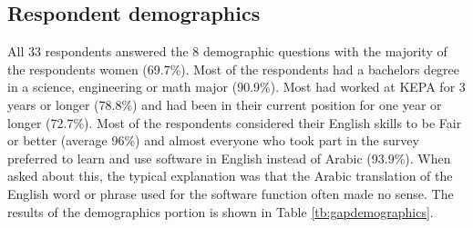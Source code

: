 \subsection{Respondent demographics}
All 33 respondents answered the 8 demographic questions with the majority of the respondents women (69.7\%). Most of the respondents had a bachelors degree in a science, engineering or math major (90.9\%). Most had worked at KEPA for 3 years or longer (78.8\%) and had been in their current position for one year or longer (72.7\%). Most of the respondents considered their English skills to be Fair or better (average 96\%) and almost everyone who took part in the survey preferred to learn and use software in English instead of Arabic (93.9\%). When asked about this, the typical explanation was that the Arabic translation of the English word or phrase used for the software function often made no sense. The results of the demographics portion is shown in Table \ref{tb:gapdemographics}.

